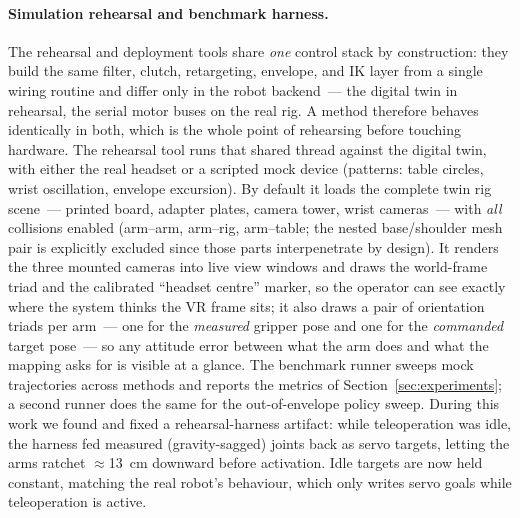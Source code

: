 \paragraph{Simulation rehearsal and benchmark harness.}
The rehearsal and deployment tools share \emph{one} control stack by
construction: they build the same filter, clutch, retargeting, envelope,
and IK layer from a single wiring routine and differ only in the robot
backend~--- the digital twin in rehearsal, the serial motor buses on the
real rig. A method therefore behaves identically in both, which is the
whole point of rehearsing before touching hardware. The rehearsal tool
runs that shared thread against the digital twin, with either the real
headset or a scripted mock device (patterns: table circles, wrist
oscillation, envelope excursion). By default it loads the complete twin
rig scene~--- printed board, adapter plates, camera tower, wrist
cameras~--- with \emph{all} collisions enabled (arm--arm, arm--rig,
arm--table; the nested base/shoulder mesh pair is explicitly excluded
since those parts interpenetrate by design). It renders the three
mounted cameras into live view windows and draws the world-frame triad
and the calibrated ``headset centre'' marker, so the operator can see
exactly where the system thinks the VR frame sits; it also draws a pair
of orientation triads per arm~--- one for the \emph{measured} gripper
pose and one for the \emph{commanded} target pose~--- so any attitude
error between what the arm does and what the mapping asks for is visible
at a glance. The
benchmark runner sweeps mock trajectories across methods and reports the
metrics of Section~\ref{sec:experiments}; a second runner does the same
for the out-of-envelope policy sweep. During this work we found and
fixed a rehearsal-harness artifact: while teleoperation was idle, the
harness fed measured (gravity-sagged) joints back as servo targets,
letting the arms ratchet \(\approx\)\SI{13}{cm} downward before
activation. Idle targets are now held constant, matching the real
robot's behaviour, which only writes servo goals while teleoperation is
active.
